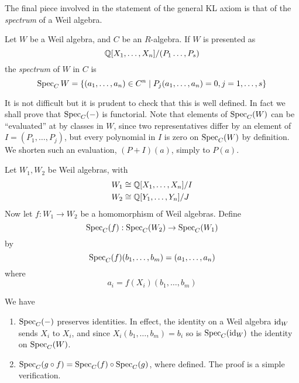 The final piece involved in the statement of the general KL axiom is that of the \emph{spectrum} of a Weil algebra.
\begin{defn}
  Let \( W \) be a Weil algebra, and \( C \) be an \( R \)-algebra. If \( W \) is presented as 
  \begin{equation*}
    \mathbb{Q}[X_1,\dots,X_n]/(P_1\dots,P_s)
  \end{equation*}
  the \emph{spectrum} of \( W \) in \( C \) is
  \begin{equation*}
    \operatorname{Spec}_C{W} = \{(a_1,\dots,a_n)\in C^n \mid P_j(a_1,\dots,a_n) = 0, j=1,\dots,s\} 
    \label{def:spec}
  \end{equation*}
\end{defn}
It is not difficult but it is prudent to check that this is well defined. In fact we shall prove that \( \operatorname{Spec}_C(-) \) is functorial. Note that elements of \( \operatorname{Spec}_C(W) \) can be ``evaluated'' at by classes in \( W \), since two representatives differ by an element of \( I=(P_1,\dots,P_j) \), but every polynomial in \( I \) is zero on \( \operatorname{Spec}_C(W) \) by definition. We shorten such an evaluation, \( (P+I)(a) \), simply to \( P(a) \). 

Let \( W_1, W_2 \) be Weil algebras, with
\begin{align*}
  W_1 &\cong \mathbb{Q}[X_1,\dots,X_n]/I \\
  W_2 &\cong \mathbb{Q}[Y_1,\dots,Y_n]/J
\end{align*}
Now let \( f:W_1\to W_2 \) be a homomorphism of Weil algebras. Define
\begin{equation*}
  \operatorname{Spec}_C(f):\operatorname{Spec}_C(W_2)\to \operatorname{Spec}_C(W_1)
\end{equation*}
by
\begin{equation*}
  \operatorname{Spec}_C(f)(b_1,\dots,b_m) = (a_1,\dots,a_n)
\end{equation*}
where
\begin{equation*}
  a_i = f(X_i)(b_1,\dots,b_m)
\end{equation*}

We have
\begin{enumerate}
  \item \(\operatorname{Spec}_C(-)\) preserves identities.
    In effect, the identity on a Weil algebra \( \operatorname{id}_W \) sends \( X_i \) to \( X_i \), and since \( X_i(b_1,\dots,b_m) = b_i \) so is \( \operatorname{Spec}_C(\operatorname{id}_W) \) the identity on \( \operatorname{Spec}_C(W) \).
  \item \(\operatorname{Spec}_C(g\circ f) = \operatorname{Spec}_C(f)\circ \operatorname{Spec}_C(g)\), where defined. The proof is a simple verification.
\end{enumerate}

